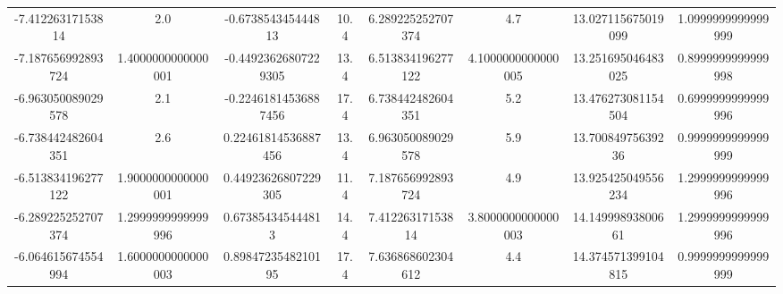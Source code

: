 \begin{table}
\begin{tabular}{S[]S[]S[]S[]S[]S[]S[]S[]}
-7.41226317153814 & 2.0                     & -0.673854345444813 & 10.4                 & 6.289225252707374 & 4.7                 & 13.027115675019099 & 1.0999999999999999\\
-7.187656992893724 & 1.4000000000000001     & -0.44923626807229305 & 13.4               & 6.513834196277122 & 4.1000000000000005  & 13.251695046483025 & 0.8999999999999998\\
-6.963050089029578 & 2.1                    & -0.22461814536887456 & 17.4               & 6.738442482604351 & 5.2                 & 13.476273081154504 & 0.6999999999999996\\
-6.738442482604351 & 2.6                    & 0.22461814536887456 & 13.4                & 6.963050089029578 & 5.9                 & 13.70084975639236 & 0.9999999999999999\\
-6.513834196277122 & 1.9000000000000001     & 0.44923626807229305 & 11.4                & 7.187656992893724 & 4.9                 & 13.925425049556234 & 1.2999999999999996\\
-6.289225252707374 & 1.2999999999999996     & 0.673854345444813 & 14.4                  & 7.41226317153814 & 3.8000000000000003   & 14.14999893800661 & 1.2999999999999996\\
-6.064615674554994 & 1.6000000000000003     & 0.8984723548210195 & 17.4                 & 7.636868602304612 & 4.4                 & 14.374571399104815 & 0.9999999999999999\\
































\bottomrule
\end{tabular}\end{table}
